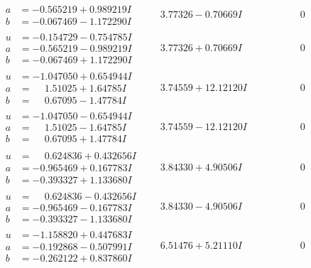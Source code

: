 \documentclass[1p]{elsarticle_modified}
\theoremstyle{definition}
\begin{document}
$$\begin{array}{c|c|c}
\begin{aligned}
a &= -0.565219 + 0.989219 I \\
b &= -0.067469 - 1.172290 I\end{aligned}
 & \phantom{-}3.77326 - 0.70669 I & \phantom{-0.000000 } 0 \\ \hline\begin{aligned}
u &= -0.154729 - 0.754785 I \\
a &= -0.565219 - 0.989219 I \\
b &= -0.067469 + 1.172290 I\end{aligned}
 & \phantom{-}3.77326 + 0.70669 I & \phantom{-0.000000 } 0 \\ \hline\begin{aligned}
u &= -1.047050 + 0.654944 I \\
a &= \phantom{-}1.51025 + 1.64785 I \\
b &= \phantom{-}0.67095 - 1.47784 I\end{aligned}
 & \phantom{-}3.74559 + 12.12120 I & \phantom{-0.000000 } 0 \\ \hline\begin{aligned}
u &= -1.047050 - 0.654944 I \\
a &= \phantom{-}1.51025 - 1.64785 I \\
b &= \phantom{-}0.67095 + 1.47784 I\end{aligned}
 & \phantom{-}3.74559 - 12.12120 I & \phantom{-0.000000 } 0 \\ \hline\begin{aligned}
u &= \phantom{-}0.624836 + 0.432656 I \\
a &= -0.965469 + 0.167783 I \\
b &= -0.393327 + 1.133680 I\end{aligned}
 & \phantom{-}3.84330 + 4.90506 I & \phantom{-0.000000 } 0 \\ \hline\begin{aligned}
u &= \phantom{-}0.624836 - 0.432656 I \\
a &= -0.965469 - 0.167783 I \\
b &= -0.393327 - 1.133680 I\end{aligned}
 & \phantom{-}3.84330 - 4.90506 I & \phantom{-0.000000 } 0 \\ \hline\begin{aligned}
u &= -1.158820 + 0.447683 I \\
a &= -0.192868 - 0.507991 I \\
b &= -0.262122 + 0.837860 I\end{aligned}
 & \phantom{-}6.51476 + 5.21110 I & \phantom{-0.000000 } 0\\

\end{array}$$
\end{document}
